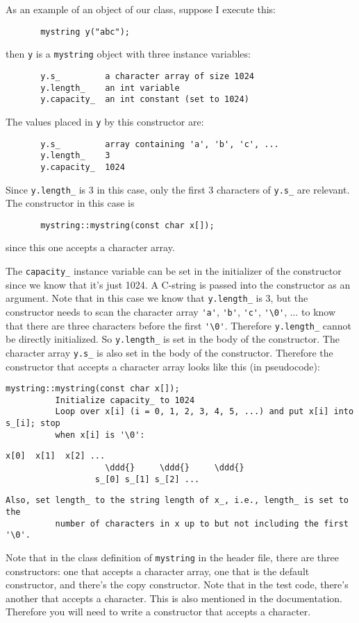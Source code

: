 As an example of an object of our class, suppose I execute this:
{\small
\begin{Verbatim}
       mystring y("abc");
\end{Verbatim}
}
then \verb!y! is a \verb!mystring! object with three instance variables:
{\small
\begin{Verbatim}
       y.s_         a character array of size 1024
       y.length_    an int variable
       y.capacity_  an int constant (set to 1024)
\end{Verbatim}
}
The values placed in \verb!y! by this constructor are:
{\small
\begin{Verbatim}
       y.s_         array containing 'a', 'b', 'c', ...
       y.length_    3
       y.capacity_  1024
\end{Verbatim}
}
Since \verb!y.length_! is 3 in this case, only the first 3 characters of
\verb!y.s_! are relevant. The constructor in
this case is
{\small
\begin{Verbatim}
       mystring::mystring(const char x[]);
\end{Verbatim}
}
since this one accepts a character array.

The \verb!capacity_! instance variable can be set in the initializer of
the constructor since we know that it's
just 1024. A C-string is passed into the constructor as an argument.
Note that in this case we know that
\verb!y.length_! is 3, but the constructor needs to scan the character array
\verb!'a'!, \verb!'b'!, \verb!'c'!, \verb!'\0'!, ... to
know that there are three characters before the first \verb!'\0'!.
Therefore \verb!y.length_! cannot be directly
initialized. So \verb!y.length_! is set in the body of the constructor.
The character array \verb!y.s_! is also set in
the body of the constructor. Therefore the constructor that accepts a
character array looks like this (in
pseudocode):
{\small
\begin{Verbatim}[commandchars = ~\@\!]
       mystring::mystring(const char x[]);
          Initialize capacity_ to 1024
          Loop over x[i] (i = 0, 1, 2, 3, 4, 5, ...) and put x[i] into s_[i]; stop
          when x[i] is '\0':
\end{Verbatim}
}
\newcommand\ddd{$\downarrow$}
{\small
\begin{Verbatim}[commandchars = \\\{\}]
                  x[0]  x[1]  x[2] ...
                    \ddd{}     \ddd{}     \ddd{}
                  s_[0] s_[1] s_[2] ...
\end{Verbatim}
}
{\small
\begin{Verbatim}[commandchars = ~\@\!]
          Also, set length_ to the string length of x_, i.e., length_ is set to the
          number of characters in x up to but not including the first '\0'.
\end{Verbatim}
}
Note that in the class definition of \verb!mystring! in the header file,
there are three constructors: one
that accepts a character array, one that is the default constructor,
and there's the copy constructor. Note that in
the test code, there's another that accepts a character.
This is also mentioned in the documentation.
Therefore you will need to write a constructor that accepts a character.

